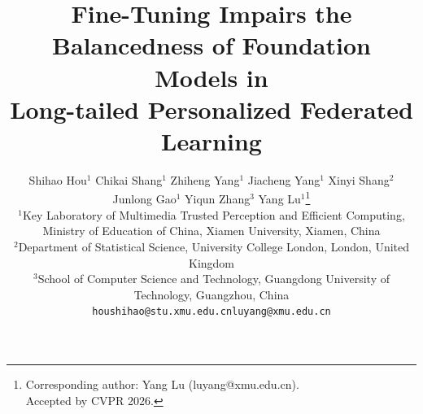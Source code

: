\documentclass[10pt,twocolumn,letterpaper]{article}
\title{Fine-Tuning Impairs the Balancedness of Foundation Models in  \\
Long-tailed Personalized Federated Learning}
\author{
    Shihao Hou$^{1}$\hspace{20pt}
    Chikai Shang$^{1}$\hspace{20pt}
    Zhiheng Yang$^{1}$\hspace{20pt}
    Jiacheng Yang$^{1}$\hspace{20pt}
    Xinyi Shang$^{2}$ \\
    Junlong Gao$^{1}$\hspace{20pt}
    Yiqun Zhang$^{3}$\hspace{20pt}
    Yang Lu$^{1}$\thanks{Corresponding author: Yang Lu (luyang@xmu.edu.cn).\protect\\\protect\hspace*{1.8em}Accepted by CVPR 2026.} \\
    {\footnotesize $^1$Key Laboratory of Multimedia Trusted Perception and Efficient Computing, Ministry of Education of China, Xiamen University, Xiamen, China} \\
    {\footnotesize $^2$Department of Statistical Science, University College London, London, United Kingdom} \\
    {\footnotesize $^3$School of Computer Science and Technology, Guangdong University of Technology, Guangzhou, China} \\
    {\tt\small houshihao@stu.xmu.edu.cn\hspace{20pt}luyang@xmu.edu.cn}
}
\begin{document}
\maketitle

\begin{abstract}




\end{abstract}
\end{document}
